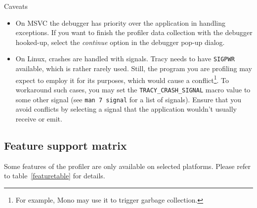 \documentclass[hidelinks,titlepage,a4paper]{article}
\begin{document}
\begin{bclogo}[
noborder=true,
couleur=black!5,
logo=\bcattention
]{Caveats}
\begin{itemize}
\item On MSVC the debugger has priority over the application in handling exceptions. If you want to finish the profiler data collection with the debugger hooked-up, select the \emph{continue} option in the debugger pop-up dialog.
\item On Linux, crashes are handled with signals. Tracy needs to have \texttt{SIGPWR} available, which is rather rarely used. Still, the program you are profiling may expect to employ it for its purposes, which would cause a conflict\footnote{For example, Mono may use it to trigger garbage collection.}. To workaround such cases, you may set the \texttt{TRACY\_CRASH\_SIGNAL} macro value to some other signal (see \texttt{man 7 signal} for a list of signals). Ensure that you avoid conflicts by selecting a signal that the application wouldn't usually receive or emit.
\end{itemize}
\end{bclogo}

\subsection{Feature support matrix}
\label{featurematrix}

Some features of the profiler are only available on selected platforms. Please refer to table~\ref{featuretable} for details.
\end{document}
